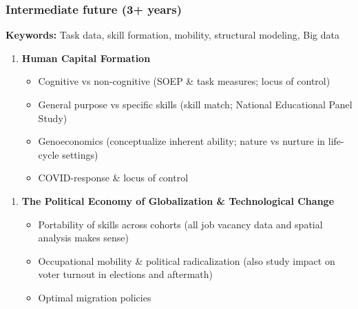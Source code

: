 \documentclass[10pt]{beamer}
\begin{document}
\begin{frame} 
	\frametitle{Intermediate future (3+ years)}
	
\textbf{Keywords:} Task data, skill formation, mobility, structural modeling, Big data

\bigskip	
	
\begin{enumerate}
	\item \textbf{Human Capital Formation}
	\begin{itemize}
		\item Cognitive vs non-cognitive (SOEP \& task measures; locus of control)
		\item General purpose vs specific skills (skill match; National Educational Panel Study)
		\item Genoeconomics (conceptualize inherent ability; nature vs nurture in life-cycle settings)
		\item COVID-response \& locus of control
	\end{itemize}
\end{enumerate}

\bigskip

\begin{enumerate}
	\item \textbf{The Political Economy of Globalization \& Technological Change}
	\begin{itemize}
		\item Portability of skills across cohorts (all job vacancy data and spatial analysis makes sense)
		\item Occupational mobility \& political radicalization (also study impact on voter turnout in elections and aftermath)
		\item Optimal migration policies
	\end{itemize}
\end{enumerate}	




	
	
\end{frame}
\end{document}
